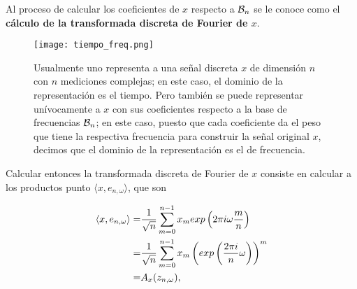 \begin{defi}
Al proceso de calcular los coeficientes de $x$
respecto a $\mathcal{B}_{n}$
se le conoce como el \textbf{cálculo de la 
transformada discreta de Fourier de $x$}.
\end{defi}



\begin{comment}
{\Huge{\textcolor{red}{TDF}}} 

{\Huge{\textcolor{red}{Dominio: tiempo}}} 


{\Huge{\textcolor{red}{Dominio: frecuencia}}}

{\Huge{ $x = (x_{m})_{0 \leq m \leq n-1}$ }}

{\Huge{ $\langle x, e_{\omega} \rangle$, $0 \leq \omega \leq n-1 $ }}

\end{comment}


\begin{figure}[H]
\centering\captionsetup{format = hang}
	\begin{measuredfigure}
		\texttt{[image: tiempo\_freq.png]} 
		\caption{Usualmente uno representa a una señal discreta
		$x$ de dimensión $n$ con $n$ mediciones complejas; en este caso, el dominio
		de la representación es el tiempo. Pero
		también se puede representar unívocamente a $x$ con sus
		coeficientes respecto a la base de frecuencias 
		$\mathcal{B}_{n}$; en este caso, puesto que cada coeficiente da
		el peso que tiene la respectiva frecuencia para construir la 
		señal original $x$, decimos que el dominio de la representación
		es el de frecuencia.}
 	\end{measuredfigure}
 \end{figure}


Calcular entonces la transformada discreta de Fourier
de $x$ consiste en calcular a los productos
punto $\langle x, e_{n,\omega} \rangle $, que son

\begin{align*}
\langle x, e_{n,\omega} \rangle = & 
\frac{1}{\sqrt{n}} \sum\limits_{m=0}^{n-1}x_{m} exp \left(
2 \pi i \omega \frac{m}{n}
\right) \\
= & 
\frac{1}{\sqrt{n}} \sum\limits_{m=0}^{n-1}x_{m} 
\left(
exp \left( \frac{2 \pi i }{n} \omega
\right) \right)^{m} \\
= & A_{x}(z_{n, \omega}),
\end{align*}


